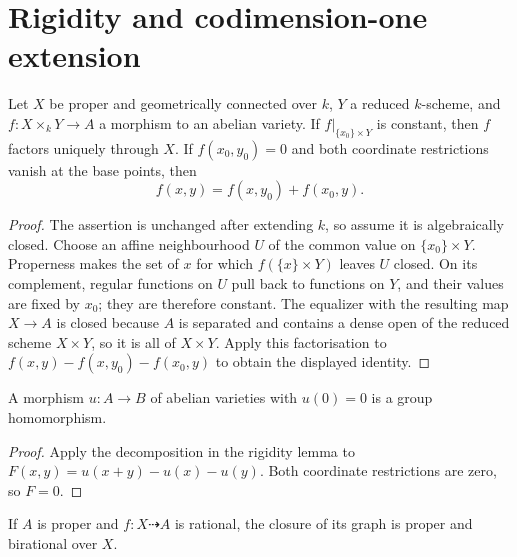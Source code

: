 \chapter{Rigidity and codimension-one extension}
\label{mk-ch-rigidity}

\begin{theorem}
  \label{mk-thm-rigidity}
  \cite{milne-av,mumford-av}
  Let \(X\) be proper and geometrically connected over \(k\), \(Y\) a reduced
  \(k\)-scheme, and \(f:X\times_kY\to A\) a morphism to an abelian variety.
  If \(f|_{\{x_0\}\times Y}\) is constant, then \(f\) factors uniquely through
  \(X\).  If \(f(x_0,y_0)=0\) and both coordinate restrictions vanish at the
  base points, then
  \[
    f(x,y)=f(x,y_0)+f(x_0,y).
  \]
\end{theorem}

\begin{proof}
  The assertion is unchanged after extending \(k\), so assume it is
  algebraically closed.  Choose an affine neighbourhood \(U\) of the common
  value on \(\{x_0\}\times Y\).  Properness makes the set of \(x\) for which
  \(f(\{x\}\times Y)\) leaves
  \(U\) closed.  On its complement, regular
  functions on \(U\) pull back to functions on \(Y\), and their values are
  fixed by \(x_0\); they are therefore constant.  The equalizer with the
  resulting map \(X\to A\) is closed because \(A\) is separated and contains
  a dense open of the reduced scheme \(X\times Y\), so it is all of
  \(X\times Y\).  Apply this factorisation to
  \(f(x,y)-f(x,y_0)-f(x_0,y)\) to obtain the displayed identity.
\end{proof}

\begin{lemma}
  \label{mk-lem-pointed-abelian-homomorphism}
  \cite{milne-av,mumford-av}
  A morphism \(u:A\to B\) of abelian varieties with \(u(0)=0\) is a group
  homomorphism.
\end{lemma}

\begin{proof}
  Apply the decomposition in the rigidity lemma to
  \(F(x,y)=u(x+y)-u(x)-u(y)\).  Both coordinate restrictions are zero, so
  \(F=0\).
\end{proof}

\begin{lemma}
  \label{mk-lem-rational-graph-proper}
  \cite{milne-av}
  If \(A\) is proper and \(f:X\dashrightarrow A\) is rational, the closure
  of its graph is proper and birational over \(X\).
\end{lemma}

